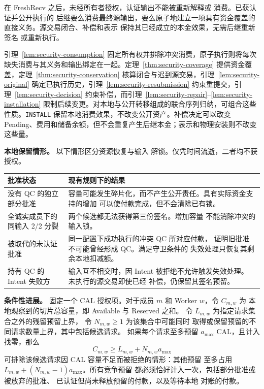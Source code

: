 \begin{theorem}[受保护的连续支付]
\label{thm:security-continuation}
在 FreshRecv 之后，未经所有者授权，认证输出不能被重新解释或
消费。已获认证并公开执行的
后继要么消费最终源输出，要么原子地建立一项具有资金覆盖的
直接义务。源交易闭合、补偿和表示
保持其已经成立的本金效果，无需后继重新签名
或重新执行。
\end{theorem}
\begin{IEEEproof}
引理~\ref{lem:security-consumption} 固定所有权并排除冲突消费，原子执行则将每次缺失消费与其义务和输出绑定在一起。定理~\ref{thm:security-coverage} 提供资金覆盖，定理~\ref{thm:security-conservation} 核算闭合与迟到源交易，引理~\ref{lem:security-original} 确定已执行历史，引理~\ref{lem:security-resubmission} 约束重提交，引理~\ref{lem:security-decision} 约束补偿，而引理~\ref{lem:security-repair}--\ref{lem:security-installation} 限制后续变更。对本地与公开转移组成的联合序列归纳，可组合这些性质。\texttt{INSTALL} 保留本地消费效果，不改变公开资产。补偿决定可以改变 Pending、费用和储备余额，但不会重复产生后继本金；表示和物理安装则不改变这些量。
\end{IEEEproof}

\noindent\textbf{本地保留情形。}
以下情形区分资源恢复与输入
解锁。仅凭时间流逝，二者均不获授权。

\par\smallskip
{\small
\setlength{\tabcolsep}{3pt}
\noindent
\begin{tabular}{@{}p{}p{}@{}}
\toprule
批准状态 & 现有规则下的结果 \\
\midrule
没有 QC 的独立部分批准 &
容量可能发生碎片化，而不产生公开责任。具有实际资金支持的增加
可以使付款完成，但不会清除已有锁。 \\

全诚实成员下的同输入 2/2 分裂 &
两个候选都无法获得第三份签名。增加容量
不能消除冲突的输入锁。 \\

被取代的未认证批准 &
同一配置下成功执行的冲突 QC 所对应付款，
证明旧批准不可能曾经形成 QC。满足守卫条件的
失效处理只恢复其剩余本地扣减额。 \\

持有 QC 的 Intent 失败方 &
输入互不相交时，因 Intent 被拒绝不允许触发失效处理。
未执行的源交易即使已经
补偿，仍保留其签名预留。 \\
\bottomrule
\end{tabular}
\par}

\noindent\textbf{条件性进展。}
固定一个 CAL 授权项。对于成员 $m$ 和 Worker $w$，令 $C_{m,w}$ 为
本地观察到的切片总容量，即 Available 与 Reserved 之和。
令 $L_{m,w}$ 为指定请求集合之外的残留预留上界，
令 $N_{m,w}\ge1$ 为该集合中可能同时
取得或保留预留的不同请求数量上界，其中包括候选请求。
如果每个请求至多预留 $a_{\max}$ CAL，且计入找零，那么
\[
  C_{m,w}\ge L_{m,w}+N_{m,w}a_{\max}
\]
可排除该候选请求因 CAL 容量不足而被拒绝的情形：其他预留
至多占用 $L_{m,w}+(N_{m,w}-1)a_{\max}$。所有竞争预留
都必须恰好计入一次，包括部分批准或被放弃的批准、
已认证但尚未释放预留的付款，以及等待本地
对账的付款。

